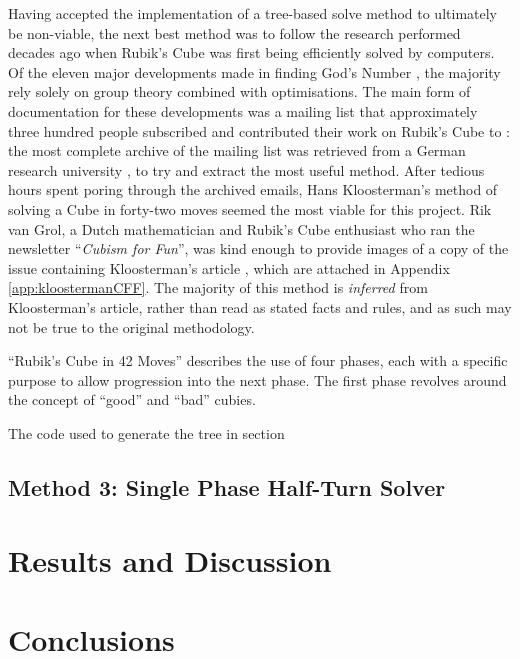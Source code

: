 \documentclass{report}
\newcommand{\tit}[1]{\textit{#1}}
\newcommand{\propernoun}[1]{\enquote{\tit{#1}}}
\begin{document}
	Having accepted the implementation of a tree-based solve method to ultimately be non-viable, the next best method was to follow the research performed decades ago when Rubik's Cube was first being efficiently solved by computers. Of the eleven major developments made in finding God's Number \cite{Rokicki2010}, the majority rely solely on group theory combined with optimisations. The main form of documentation for these developments was a mailing list that approximately three hundred people subscribed and contributed their work on Rubik's Cube to \cite{Schoenert1996}: the most complete archive of the mailing list was retrieved from a German research university \cite{Schoenert1996}, \cite{RWTHAachenUniversity} to try and extract the most useful method. After tedious hours spent poring through the archived emails, Hans Kloosterman's method of solving a Cube in forty-two moves seemed the most viable for this project. Rik van Grol, a Dutch mathematician and Rubik's Cube enthusiast who ran the newsletter \propernoun{Cubism for Fun}, was kind enough to provide images of a copy of the issue containing Kloosterman's article \cite{Kloosterman1990}, which are attached in Appendix \ref{app:kloostermanCFF}.	The majority of this method is \tit{inferred} from Kloosterman's article, rather than read as stated facts and rules, and as such may not be true to the original methodology.
	
	\enquote{Rubik's Cube in 42 Moves} describes the use of four phases, each with a specific purpose to allow progression into the next phase. The first phase revolves around the concept of \enquote{good} and \enquote{bad} cubies.

	The code used to generate the tree in section 
	
	\section{Method 3: Single Phase Half-Turn Solver}
    
    
    
    \newpage
    \chapter{Results and Discussion}
    
    \newpage
    \chapter{Conclusions}
    
\end{document}
